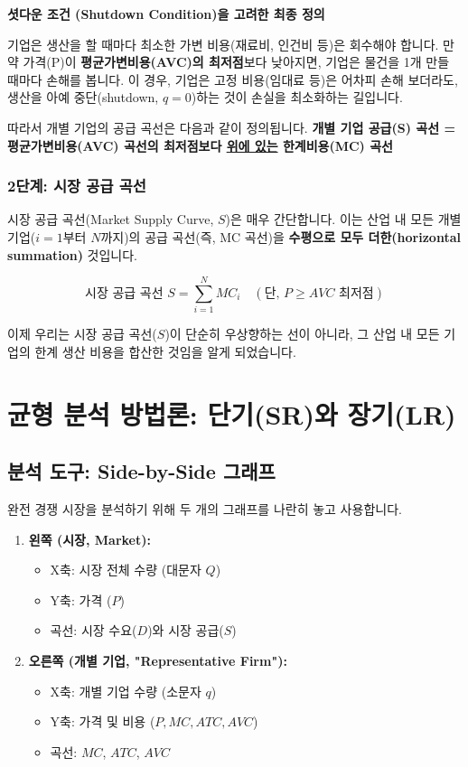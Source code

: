 \documentclass[11pt,a4paper]{book}
\theoremstyle{definition}
\begin{document}
\begin{warningbox}
\textbf{셧다운 조건 (Shutdown Condition)을 고려한 최종 정의}

기업은 생산을 할 때마다 최소한 가변 비용(재료비, 인건비 등)은 회수해야 합니다.
만약 가격(P)이 \textbf{평균가변비용(AVC)의 최저점}보다 낮아지면, 기업은 물건을 1개 만들 때마다 손해를 봅니다.
이 경우, 기업은 고정 비용(임대료 등)은 어차피 손해 보더라도, 생산을 아예 중단(shutdown, $q=0$)하는 것이 손실을 최소화하는 길입니다.

따라서 개별 기업의 공급 곡선은 다음과 같이 정의됩니다.
\textbf{개별 기업 공급(S) 곡선 = 평균가변비용(AVC) 곡선의 최저점보다 \underline{위에 있는} 한계비용(MC) 곡선}
\end{warningbox}

\subsubsection{2단계: 시장 공급 곡선}

시장 공급 곡선(Market Supply Curve, $S$)은 매우 간단합니다.
이는 산업 내 모든 개별 기업($i=1$부터 $N$까지)의 공급 곡선(즉, MC 곡선)을 \textbf{수평으로 모두 더한(horizontal summation)} 것입니다.

$$
\text{시장 공급 곡선 } S = \sum_{i=1}^{N} MC_i \quad (\text{단, } P \ge AVC \text{ 최저점})
$$

이제 우리는 시장 공급 곡선($S$)이 단순히 우상향하는 선이 아니라, 그 산업 내 모든 기업의 한계 생산 비용을 합산한 것임을 알게 되었습니다.


\section{균형 분석 방법론: 단기(SR)와 장기(LR)}

\subsection{분석 도구: Side-by-Side 그래프}

완전 경쟁 시장을 분석하기 위해 두 개의 그래프를 나란히 놓고 사용합니다.

\begin{enumerate}
    \item \textbf{왼쪽 (시장, Market):}
    \begin{itemize}
        \item X축: 시장 전체 수량 (대문자 $Q$)
        \item Y축: 가격 ($P$)
        \item 곡선: 시장 수요($D$)와 시장 공급($S$)
    \end{itemize}
    \item \textbf{오른쪽 (개별 기업, "Representative Firm"):}
    \begin{itemize}
        \item X축: 개별 기업 수량 (소문자 $q$)
        \item Y축: 가격 및 비용 ($P, MC, ATC, AVC$)
        \item 곡선: $MC$, $ATC$, $AVC$
    \end{itemize}
\end{enumerate}
\end{document}
